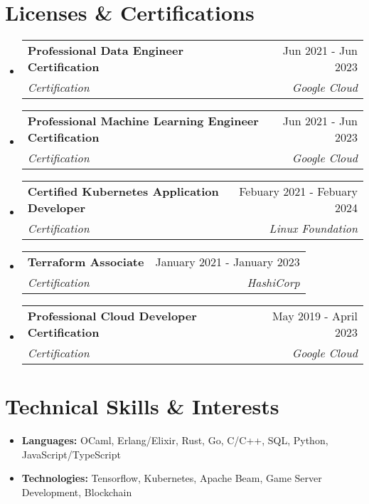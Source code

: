 \documentclass[letterpaper,11pt]{article}
\makeatletter
\newcommand{\resumeItem}[1]{
  \item\small{#1 \vspace{-2pt}}
}
\newcommand{\resumeSubheading}[4]{
  \vspace{-1pt}\item
    \begin{tabular*}{0.97\textwidth}[t]{l@{\extracolsep{\fill}}r}
      \textbf{#1} & #2 \\
      \textit{\small#3} & \textit{\small #4} \\
    \end{tabular*}\vspace{-5pt}
}
\newcommand{\resumeSubHeadingListStart}{\begin{itemize}[leftmargin=*]}
\newcommand{\resumeSubHeadingListEnd}{\end{itemize}}
\makeatother
\begin{document}
\section{Licenses \& Certifications}
\resumeSubHeadingListStart{}
\resumeSubheading{Professional Data Engineer Certification}
{Jun 2021 - Jun 2023}
{Certification}
{Google Cloud}
\resumeSubheading{Professional Machine Learning Engineer Certification}
{Jun 2021 - Jun 2023}
{Certification}
{Google Cloud}
\resumeSubheading{Certified Kubernetes Application Developer}
{Febuary 2021 - Febuary 2024}
{Certification}
{Linux Foundation}
\resumeSubheading{Terraform Associate}
{January 2021 - January 2023}
{Certification}
{HashiCorp}
\resumeSubheading{Professional Cloud Developer Certification}
{May 2019 - April 2023}
{Certification}
{Google Cloud}
\resumeSubHeadingListEnd{}

\section{Technical Skills \& Interests}
\resumeSubHeadingListStart{}
\resumeItem{
  \textbf{Languages:}{
    OCaml, Erlang/Elixir, Rust, Go, C/C++, SQL, Python, JavaScript/TypeScript
  }
}
\resumeItem{
  \textbf{Technologies:}{
    Tensorflow, Kubernetes, Apache Beam, Game Server Development, Blockchain
  }
}
\resumeSubHeadingListEnd{}
\end{document}
